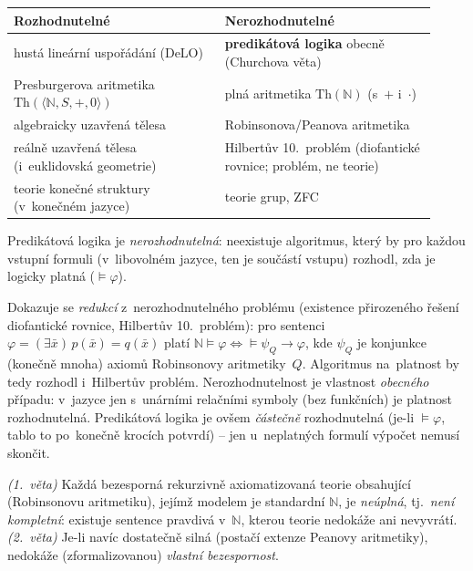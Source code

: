 \documentclass[11pt,a4paper]{article}
\begin{document}
\begin{center}
\renewcommand{\arraystretch}{1.15}
\begin{tabular}{p{0.46\linewidth} p{0.46\linewidth}}
\toprule
\textbf{Rozhodnutelné} & \textbf{Nerozhodnutelné}\\
\midrule
hustá lineární uspořádání (DeLO) & \textbf{predikátová logika} obecně (Churchova věta)\\
Presburgerova aritmetika $\mathrm{Th}(\langle\mathbb{N},S,+,0\rangle)$ & plná aritmetika $\mathrm{Th}(\mathbb{N})$ (s~$+$ i~$\cdot$)\\
algebraicky uzavřená tělesa & Robinsonova/Peanova aritmetika\\
reálně uzavřená tělesa (i~euklidovská geometrie) & Hilbertův 10.\ problém (diofantické rovnice; problém, ne teorie)\\
teorie konečné struktury (v~konečném jazyce) & teorie grup, ZFC\\
\bottomrule
\end{tabular}
\end{center}

\begin{veta}
Predikátová logika je \emph{nerozhodnutelná}: neexistuje algoritmus, který by pro každou vstupní formuli (v~libovolném jazyce, ten je součástí vstupu) rozhodl, zda je logicky platná ($\models\varphi$).
\end{veta}

\begin{intuice}
Dokazuje se \emph{redukcí} z~nerozhodnutelného problému (existence přirozeného řešení diofantické rovnice, Hilbertův 10.\ problém): pro sentenci $\varphi=(\exists\bar x)\,p(\bar x)=q(\bar x)$ platí $\mathbb{N}\models\varphi\iff{}\models\psi_Q\to\varphi$, kde $\psi_Q$ je konjunkce (konečně mnoha) axiomů Robinsonovy aritmetiky~$Q$. Algoritmus na~platnost by tedy rozhodl i~Hilbertův problém. Nerozhodnutelnost je vlastnost \emph{obecného} případu: v~jazyce jen s~unárními relačními symboly (bez funkčních) je platnost rozhodnutelná. Predikátová logika je ovšem \emph{částečně} rozhodnutelná (je-li $\models\varphi$, tablo to po~konečně krocích potvrdí) -- jen u~neplatných formulí výpočet nemusí skončit.
\end{intuice}

\begin{veta}
\emph{(1.\ věta)} Každá bezesporná rekurzivně axiomatizovaná teorie obsahující  (Robinsonovu aritmetiku), jejímž modelem je standardní $\mathbb{N}$, je \emph{neúplná}, tj.\ \emph{není kompletní}: existuje sentence pravdivá v~$\mathbb{N}$, kterou teorie nedokáže ani nevyvrátí. \emph{(2.\ věta)} Je-li navíc dostatečně silná (postačí extenze Peanovy aritmetiky), nedokáže (zformalizovanou) \emph{vlastní bezespornost}.
\end{veta}
\end{document}
